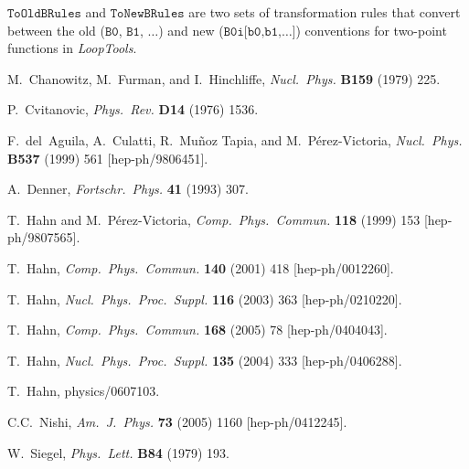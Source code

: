 \documentclass[twoside,11pt]{article}
\def\LT{\textit{LoopTools}}
\def\Code#1{\ensuremath{\texttt{#1}}}
\begin{document}
\Code{ToOldBRules} and \Code{ToNewBRules} are two sets of transformation
rules that convert between the old (\Code{B0}, \Code{B1}, $\dots$) and
new (\Code{B0i[b0,b1,$\dots$]}) conventions for two-point functions in
\LT.


\pagebreak

\begin{flushleft}
\begin{thebibliography}{999}

\newcommand{\acm}[3]{\textsl{ACM Trans.\ Math.\ Software} \textbf{#1} (#2) #3}
\newcommand{\ajp}[3]{\textsl{Am.\ J.\ Phys.} \textbf{#1} (#2) #3}
\newcommand{\app}[3]{\textsl{Acta Phys.\ Polon.} \textbf{#1} (#2) #3}
\newcommand{\cpc}[3]{\textsl{Comp.\ Phys.\ Commun.} \textbf{#1} (#2) #3}
\newcommand{\fp}[3]{\textsl{Fortschr.\ Phys.} \textbf{#1} (#2) #3}
\newcommand{\np}[3]{\textsl{Nucl.\ Phys.} \textbf{#1} (#2) #3}
\newcommand{\npps}[3]{\textsl{Nucl.\ Phys.\ Proc.\ Suppl.} \textbf{#1} (#2) #3}
\newcommand{\pl}[3]{\textsl{Phys.\ Lett.} \textbf{#1} (#2) #3}
\newcommand{\pr}[3]{\textsl{Phys.\ Rev.} \textbf{#1} (#2) #3}
\newcommand{\prl}[3]{\textsl{Phys.\ Rev.\ Lett.} \textbf{#1} (#2) #3}
\newcommand{\zp}[3]{\textsl{Z.\ Phys.} \textbf{#1} (#2) #3}

M.~Chanowitz, M.~Furman, and I.~Hinchliffe, \np{B159}{1979}{225}.

P.~Cvitanovic, \pr{D14}{1976}{1536}.

F.~del~Aguila, A.~Culatti, R.~Mu\~noz Tapia, and M.~P\'erez-Victoria,
\np{B537}{1999}{561} [hep-ph/9806451].

A.~Denner, \fp{41}{1993}{307}.

T.~Hahn and M.~P\'erez-Victoria, \cpc{118}{1999}{153} [hep-ph/9807565].

T.~Hahn, \cpc{140}{2001}{418} [hep-ph/0012260].

T.~Hahn, \npps{116}{2003}{363} [hep-ph/0210220].

T.~Hahn, \cpc{168}{2005}{78} [hep-ph/0404043].

T.~Hahn, \npps{135}{2004}{333} [hep-ph/0406288].

T.~Hahn, physics/0607103.

C.C.~Nishi, \ajp{73}{2005}{1160} [hep-ph/0412245].

W.~Siegel, \pl{B84}{1979}{193}.


\end{thebibliography}
\end{flushleft}
\end{document}

